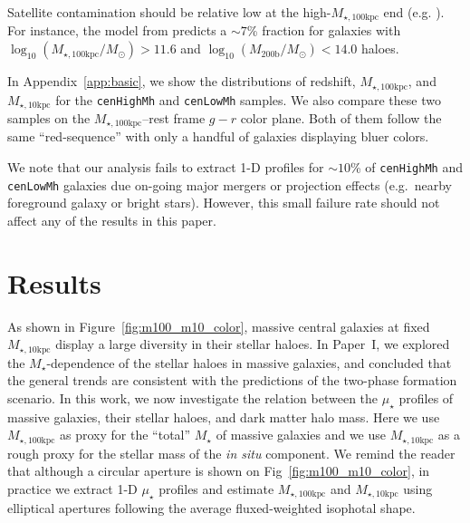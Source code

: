 \documentclass[a4paper,fleqn,usenatbib]{mnras}
\def\rbcg{\texttt{cenHighMh}}
\def\nbcg{\texttt{cenLowMh}}
\def\mstar{{$M_{\star}$}}
\def\logmh{{$\log_{10} (M_{\mathrm{200b}}/M_{\odot})$}}
\def\minn{{$M_{\star,10\mathrm{kpc}}$}}
\def\mtot{{$M_{\star,100\mathrm{kpc}}$}}
\def\logmtot{{$\log_{10} (M_{\star,100\mathrm{kpc}}/M_{\odot})$}}
\def\mden{{$\mu_{\star}$}}
\begin{document}
    Satellite contamination should be relative low at the high-\mtot{} end
    (e.g. \citealt{Reid2014, Hoshino2015, Saito2016, vanUitert2016}). 
    For instance, the model from \citet{Saito2016} predicts a $\sim 7$\% 
    fraction for galaxies with \logmtot{}$>11.6$ and \logmh$<14.0$ haloes.
    
    In Appendix~\ref{app:basic}, we show the distributions of redshift, \mtot{}, and 
    \minn{} for the \rbcg{} and \nbcg{} samples. 
    We also compare these two samples on the \mtot{}--rest frame $g-r$ color plane. 
    Both of them follow the same ``red-sequence'' with only a handful of galaxies 
    displaying bluer colors.
    
    We note that our analysis fails to extract 1-D profiles for $\sim10$\% of 
    \rbcg{} and \nbcg{} galaxies due on-going major mergers or projection effects 
    (e.g.\ nearby foreground galaxy or bright stars). 
    However, this small failure rate should not affect any of the results in this paper.
    

\section{Results}
    \label{sec:result}
    
    As shown in Figure~\ref{fig:m100_m10_color}, massive central galaxies at fixed  
    \minn{} display a large diversity in their stellar haloes. 
    In Paper~I, we explored the \mstar{}-dependence of the stellar haloes in massive 
    galaxies, and concluded that the general trends are consistent with the predictions 
    of the two-phase formation scenario. 
    In this work, we now investigate the relation between the \mden{} profiles of 
    massive galaxies, their stellar haloes, and dark matter halo mass. 
    Here we use \mtot{} as proxy for the ``total'' \mstar{} of massive galaxies and 
    we use \minn{} as a rough proxy for the stellar mass of the \textit{in situ} 
    component.  
    We remind the reader that although a circular aperture is shown on 
    Fig~\ref{fig:m100_m10_color}, in practice we extract 1-D \mden{} profiles and 
    estimate \mtot{} and \minn{} using elliptical apertures following the average 
    fluxed-weighted isophotal shape. 
\end{document}
